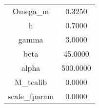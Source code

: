 \begin{table}\centering\begin{tabular}{cc}
Omega_m & 0.3250 \\
h & 0.7000 \\
gamma & 3.0000 \\
beta & 45.0000 \\
alpha & 500.0000 \\
M_tcalib & 0.0000 \\
scale_fparam & 0.0000 \\
\end{tabular}\end{table}